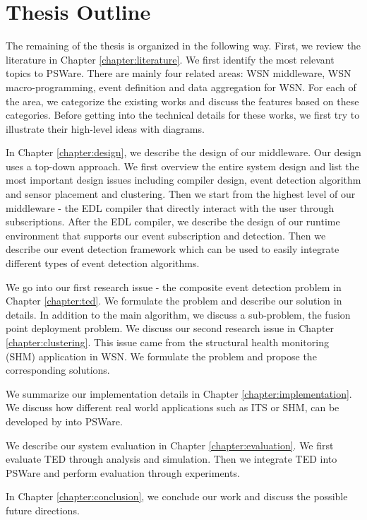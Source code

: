 \section{Thesis Outline}
\label{sec:introduction:outline}

The remaining of the thesis is organized in the following way. First, we review the literature in Chapter \ref{chapter:literature}. We first identify the most relevant topics to PSWare. There are mainly four related areas: WSN middleware, WSN macro-programming, event definition and data aggregation for WSN. For each of the area, we categorize the existing works and discuss the features based on these categories. Before getting into the technical details for these works, we first try to illustrate their high-level ideas with diagrams.

In Chapter \ref{chapter:design}, we describe the design of our middleware. Our design uses a top-down approach. We first overview the entire system design and list the most important design issues including compiler design, event detection algorithm and sensor placement and clustering. Then we start from the highest level of our middleware - the EDL compiler that directly interact with the user through subscriptions. After the EDL compiler, we describe the design of our runtime environment that supports our event subscription and detection. Then we describe our event detection framework which can be used to easily integrate different types of event detection algorithms.

We go into our first research issue - the composite event detection problem in Chapter \ref{chapter:ted}. We formulate the problem and describe our solution in details. In addition to the main algorithm, we discuss a sub-problem, the fusion point deployment problem. We discuss our second research issue in Chapter \ref{chapter:clustering}. This issue came from the structural health monitoring (SHM) application in WSN. We formulate the problem and propose the corresponding solutions.

We summarize our implementation details in Chapter \ref{chapter:implementation}. We discuss how different real world applications such as ITS or SHM, can be developed by into PSWare.

We describe our system evaluation in Chapter \ref{chapter:evaluation}. We first evaluate TED through analysis and simulation. Then we integrate TED into PSWare and perform evaluation through experiments.

In Chapter \ref{chapter:conclusion}, we conclude our work and discuss the possible future directions.